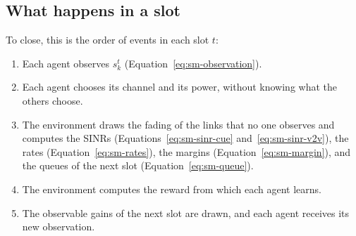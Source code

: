 \subsection{What happens in a slot}
\label{sec:sm-slot}

To close, this is the order of events in each slot $t$:
\begin{enumerate}[nosep]
  \item Each agent observes $s_k^t$ (Equation~\ref{eq:sm-observation}).
  \item Each agent chooses its channel and its power, without knowing what the others choose.
  \item The environment draws the fading of the links that no one observes and computes the \acp{SINR}
    (Equations~\ref{eq:sm-sinr-cue} and~\ref{eq:sm-sinr-v2v}), the rates (Equation~\ref{eq:sm-rates}), the
    margins (Equation~\ref{eq:sm-margin}), and the queues of the next slot (Equation~\ref{eq:sm-queue}).
  \item The environment computes the reward from which each agent learns.
  \item The observable gains of the next slot are drawn, and each agent receives its new observation.
\end{enumerate}
